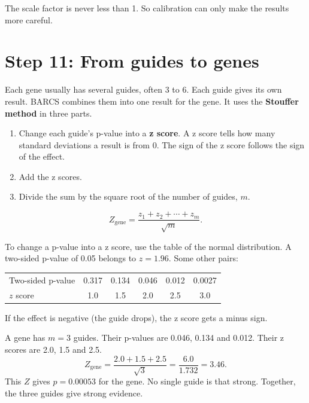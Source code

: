 \documentclass[12pt]{article}
\begin{document}
The scale factor is never less than 1. So calibration can only make the
results more careful.

\section{Step 11: From guides to genes}

Each gene usually has several guides, often 3 to 6. Each guide gives its
own result. BARCS combines them into one result for the gene. It uses the
\textbf{Stouffer method} in three parts.

\begin{enumerate}
\item Change each guide's p-value into a \textbf{z score}. A z score tells
  how many standard deviations a result is from 0. The sign of the z score
  follows the sign of the effect.
\item Add the z scores.
\item Divide the sum by the square root of the number of guides, $m$.
\end{enumerate}
\[
Z_{\text{gene}} = \frac{z_1 + z_2 + \cdots + z_m}{\sqrt{m}}.
\]

To change a p-value into a z score, use the table of the normal
distribution. A two-sided p-value of 0.05 belongs to $z = 1.96$. Some
other pairs:

\begin{center}
\begin{tabular}{lccccc}
\toprule
Two-sided p-value & 0.317 & 0.134 & 0.046 & 0.012 & 0.0027\\
$z$ score & 1.0 & 1.5 & 2.0 & 2.5 & 3.0\\
\bottomrule
\end{tabular}
\end{center}

If the effect is negative (the guide drops), the z score gets a minus sign.

\begin{worked}
A gene has $m = 3$ guides. Their p-values are 0.046, 0.134 and 0.012. Their
z scores are 2.0, 1.5 and 2.5.
\[
Z_{\text{gene}} = \frac{2.0 + 1.5 + 2.5}{\sqrt{3}} = \frac{6.0}{1.732}
 = 3.46.
\]
This $Z$ gives $p = 0.00053$ for the gene. No single guide is that strong.
Together, the three guides give strong evidence.
\end{worked}
\end{document}
